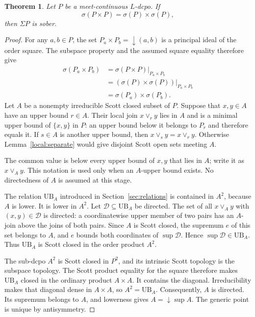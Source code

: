 \documentclass[fleqn,preprint,3p,a4paper]{elsarticle}
\newtheorem{theorem}{Theorem}[section]
\theoremstyle{definition}
\begin{document}
\begin{theorem}\label{local:sober}
Let $P$ be a meet-continuous $L$-dcpo. If
\[
 \sigma(P\times P)=\sigma(P)\times\sigma(P),
\]
then $\Sigma P$ is sober. %
\end{theorem}
\begin{proof}
For any $a,b\in P$, the set $P_a\times P_b={\downarrow}(a,b)$ is a principal ideal of the order square. The subspace property and the assumed square equality therefore give
\[
\begin{aligned}
 \sigma(P_a\times P_b)
 &=\left.\sigma(P\times P)\right|_{P_a\times P_b}\\
 &=\left.(\sigma(P)\times\sigma(P))\right|_{P_a\times P_b}\\
 &=\sigma(P_a)\times\sigma(P_b).
\end{aligned}
\]
Let $A$ be a nonempty irreducible Scott closed subset of $P$. Suppose that $x,y\in A$ have an upper bound $r\in A$. Their local join $x\vee_r y$ lies in $A$ and is a minimal upper bound of $\{x,y\}$ in $P$: an upper bound below it belongs to $P_r$ and therefore equals it. If $s\in A$ is another upper bound, then $x\vee_s y=x\vee_r y$. Otherwise Lemma~\ref{local:separate} would give disjoint Scott open sets meeting $A$.

The common value is below every upper bound of $x,y$ that lies in $A$; write it as $x\vee_A y$. This notation is used only when an $A$-upper bound exists. No directedness of $A$ is assumed at this stage.

The relation $\mathrm{UB}_A$ introduced in Section~\ref{sec:relations} is contained in $A^2$, because $A$ is lower. It is lower in $A^2$. Let $\mathcal D\subseteq\mathrm{UB}_A$ be directed. The set of all $x\vee_A y$ with $(x,y)\in\mathcal D$ is directed: a coordinatewise upper member of two pairs has an $A$-join above the joins of both pairs. Since $A$ is Scott closed, the supremum $e$ of this set belongs to $A$, and $e$ bounds both coordinates of $\sup\mathcal D$. Hence $\sup\mathcal D\in\mathrm{UB}_A$. Thus $\mathrm{UB}_A$ is Scott closed in the order product $A^2$.

The sub-dcpo $A^2$ is Scott closed in $P^2$, and its intrinsic Scott topology is the subspace topology. The Scott product equality for the square therefore makes $\mathrm{UB}_A$ closed in the ordinary product $A\times A$. It contains the diagonal. Irreducibility makes that diagonal dense in $A\times A$, so $A^2=\mathrm{UB}_A$. Consequently, $A$ is directed. Its supremum belongs to $A$, and lowerness gives $A={\downarrow}\sup A$. The generic point is unique by antisymmetry.
\end{proof}
\end{document}
